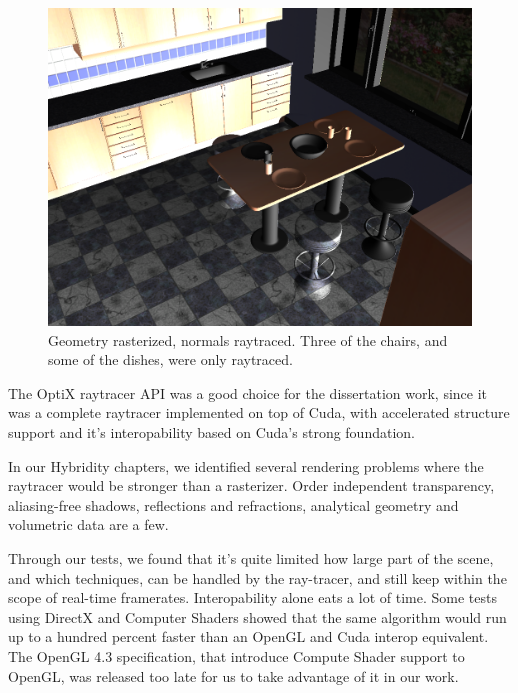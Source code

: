 \begin{figure}[H]
	\centering
	\includegraphics[width=1.00\textwidth]{Media/hybrid.png}
	\caption{Geometry rasterized, normals raytraced. Three of the chairs, and some of the dishes, were only raytraced.}
	\label{fig:hybrid_image01}
\end{figure}

The OptiX raytracer API was a good choice for the dissertation work, since it was a complete raytracer implemented on top of Cuda, with accelerated structure support and it's interopability based on Cuda's strong foundation.

In our Hybridity chapters, we identified several rendering problems where the raytracer would be stronger than a rasterizer. Order independent transparency, aliasing-free shadows, reflections and refractions, analytical geometry and volumetric data are a few.

Through our tests, we found that it's quite limited how large part of the scene, and which techniques, can be handled by the ray-tracer, and still keep within the scope of real-time framerates. Interopability alone eats a lot of time. Some tests using DirectX and Computer Shaders showed that the same algorithm would run up to a hundred percent faster than an OpenGL and Cuda interop equivalent. The OpenGL 4.3 specification, that introduce Compute Shader support to OpenGL, was released too late for us to take advantage of it in our work.

